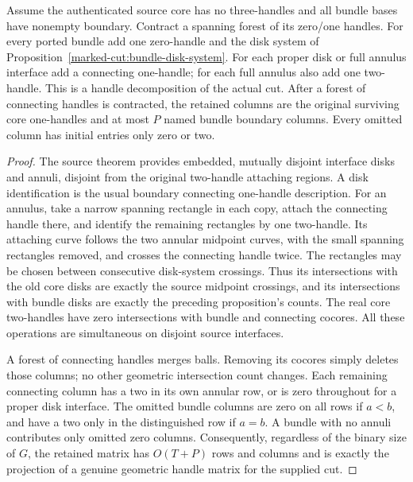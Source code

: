 \begin{proposition}
\label{marked-cut:projected-gluing}
Assume the authenticated source core has no three-handles and all bundle
bases have nonempty boundary. Contract a spanning forest of its zero/one
handles. For every ported bundle add one zero-handle and the disk system
of Proposition~\ref{marked-cut:bundle-disk-system}. For each proper disk or
full annulus interface add a connecting one-handle; for each full annulus
also add one two-handle. This is a handle decomposition of the actual cut.
After a forest of connecting handles is contracted, the retained columns
are the original surviving core one-handles and at most $P$ named bundle
boundary columns. Every omitted column has initial entries only zero or two.
\end{proposition}
\begin{proof}
The source theorem provides embedded, mutually disjoint interface disks and
annuli, disjoint from the original two-handle attaching regions. A disk
identification is the usual boundary connecting one-handle description.
For an annulus, take a narrow spanning rectangle in each copy, attach the
connecting handle there, and identify the remaining rectangles by one
two-handle. Its attaching curve follows the two annular midpoint curves,
with the small spanning rectangles removed, and crosses the connecting
handle twice. The rectangles may be chosen between consecutive disk-system
crossings. Thus its intersections with the old core disks are exactly the
source midpoint crossings, and its intersections with bundle disks are
exactly the preceding proposition's counts. The real core two-handles have
zero intersections with bundle and connecting cocores. All these operations
are simultaneous on disjoint source interfaces.

A forest of connecting handles merges balls. Removing its cocores simply
deletes those columns; no other geometric intersection count changes.
Each remaining connecting column has a two in its own annular row, or is
zero throughout for a proper disk interface. The omitted bundle columns
are zero on all rows if $a<b$, and have a two only in the distinguished row
if $a=b$. A bundle with no annuli contributes only omitted zero columns.
Consequently, regardless of the binary size of $G$, the retained matrix
has $O(T+P)$ rows and columns and is exactly the projection of a genuine
geometric handle matrix for the supplied cut.
\end{proof}

